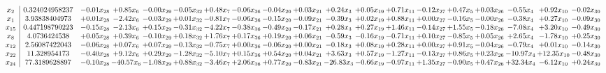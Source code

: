 \documentclass[9pt]{article}
\begin{document}
 \[\begin{array}{c| c c@{\hskip 2pt} c@{\hskip 2pt} c@{\hskip 2pt} c@{\hskip 2pt} c@{\hskip 2pt} c@{\hskip 2pt} c@{\hskip 2pt} c@{\hskip 2pt} c@{\hskip 2pt} c@{\hskip 2pt} c@{\hskip 2pt} c@{\hskip 2pt} c@{\hskip 2pt} c@{\hskip 2pt} c@{\hskip 2pt} c@{\hskip 2pt} c@{\hskip 2pt} }
 x_{2}   &  0.324024958237 & -0.01 x_{28} & +  0.85 x_{6} & -0.00 x_{29} & -0.05 x_{32} & +  0.48 x_{7} & -0.06 x_{36} & -0.04 x_{20} & +  0.03 x_{21} & +  0.24 x_{3} & +  0.05 x_{19} & +  0.71 x_{11} & -0.12 x_{27} & +  0.47 x_{5} & +  0.03 x_{26} & -0.55 x_{4} & +  0.92 x_{10} & -0.02 x_{30}\\
 x_{1}   &  3.93838404973 & +  0.01 x_{28} & -2.42 x_{6} & -0.03 x_{29} & +  0.01 x_{32} & -0.81 x_{7} & -0.06 x_{36} & -0.15 x_{20} & -0.09 x_{21} & -0.39 x_{3} & +  0.02 x_{19} & +  0.88 x_{11} & +  0.00 x_{27} & -0.16 x_{5} & -0.00 x_{26} & -0.38 x_{4} & +  0.27 x_{10} & -0.09 x_{30}\\
 x_{15}   &  0.447198790223 & -0.15 x_{28} & -2.13 x_{6} & +  0.15 x_{29} & -0.31 x_{32} & -4.22 x_{7} & -0.38 x_{36} & -0.49 x_{20} & -0.17 x_{21} & +  0.28 x_{3} & +  0.27 x_{19} & +  1.46 x_{11} & -0.14 x_{27} & +  1.55 x_{5} & -0.18 x_{26} & -7.08 x_{4} & +  3.20 x_{10} & -0.49 x_{30}\\
 x_{8}   &  4.0736424538 & +  0.05 x_{28} & +  0.39 x_{6} & -0.10 x_{29} & +  0.18 x_{32} & +  1.76 x_{7} & +  0.17 x_{36} & +  0.19 x_{20} & +  0.06 x_{21} & -0.59 x_{3} & -0.16 x_{19} & -0.71 x_{11} & +  0.10 x_{27} & -0.85 x_{5} & +  0.05 x_{26} & +  2.65 x_{4} & -1.78 x_{10} & +  0.25 x_{30}\\
 x_{12}   &  2.56087422043 & -0.06 x_{28} & +  0.07 x_{6} & +  0.07 x_{29} & -0.13 x_{32} & -0.75 x_{7} & +  0.00 x_{36} & -0.06 x_{20} & +  0.00 x_{21} & -0.18 x_{3} & +  0.08 x_{19} & +  0.28 x_{11} & +  0.00 x_{27} & +  0.91 x_{5} & -0.04 x_{26} & -0.79 x_{4} & +  0.01 x_{10} & -0.14 x_{30}\\
 x_{22}   &  11.328954173 & -0.40 x_{28} & +  9.12 x_{6} & +  0.29 x_{29} & -1.28 x_{32} & -5.10 x_{7} & +  0.15 x_{36} & +  0.54 x_{20} & +  0.04 x_{21} & +  3.63 x_{3} & +  0.57 x_{19} & -1.27 x_{11} & -0.13 x_{27} & +  0.86 x_{5} & +  0.23 x_{26} & -10.97 x_{4} & + 12.35 x_{10} & -0.48 x_{30}\\
 x_{24}   &  77.3189628897 & -0.10 x_{28} & -40.57 x_{6} & -1.08 x_{29} & +  0.88 x_{32} & -3.46 x_{7} & +  2.06 x_{36} & +  0.77 x_{20} & -0.83 x_{21} & -26.83 x_{3} & -0.66 x_{19} & -0.97 x_{11} & +  1.35 x_{27} & -0.90 x_{5} & +  0.47 x_{26} & + 32.34 x_{4} & -6.12 x_{10} & +  0.24 x_{30}\\

\end{array}\]
\end{document}
